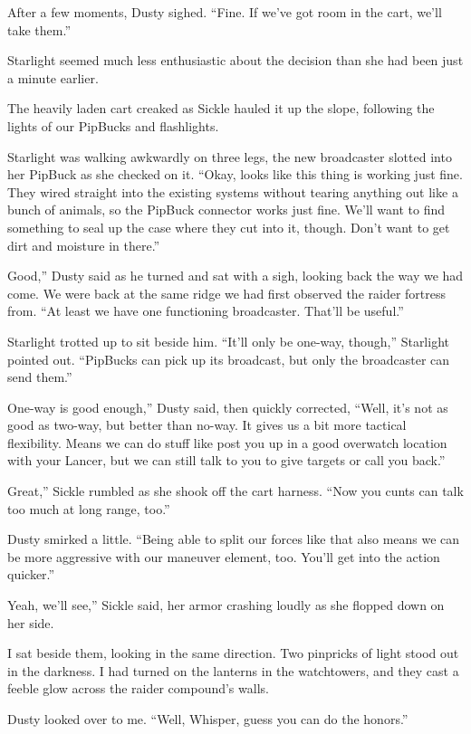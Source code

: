 After a few moments, Dusty sighed. “Fine. If we’ve got room in the cart, we’ll take them.”

Starlight seemed much less enthusiastic about the decision than she had been just a minute earlier.

{\br}%
The heavily laden cart creaked as Sickle hauled it up the slope, following the lights of our PipBucks and flashlights.

Starlight was walking awkwardly on three legs, the new broadcaster slotted into her PipBuck as she checked on it. “Okay, looks like this thing is working just fine. They wired straight into the existing systems without tearing anything out like a bunch of animals, so the PipBuck connector works just fine. We’ll want to find something to seal up the case where they cut into it, though. Don’t want to get dirt and moisture in there.”

\leavevmode{}Good,” Dusty said as he turned and sat with a sigh, looking back the way we had come. We were back at the same ridge we had first observed the raider fortress from. “At least we have one functioning broadcaster. That’ll be useful.”

Starlight trotted up to sit beside him. “It’ll only be one-way, though,” Starlight pointed out. “PipBucks can pick up its broadcast, but only the broadcaster can send them.”

\leavevmode{}One-way is good enough,” Dusty said, then quickly corrected, “Well, it’s not as good as two-way, but better than no-way. It gives us a bit more tactical flexibility. Means we can do stuff like post you up in a good overwatch location with your Lancer, but we can still talk to you to give targets or call you back.”

\leavevmode{}Great,” Sickle rumbled as she shook off the cart harness. “Now you cunts can talk too much at long range, too.”

Dusty smirked a little. “Being able to split our forces like that also means we can be more aggressive with our maneuver element, too. You’ll get into the action quicker.”

\leavevmode{}Yeah, we’ll see,” Sickle said, her armor crashing loudly as she flopped down on her side.

I sat beside them, looking in the same direction. Two pinpricks of light stood out in the darkness. I had turned on the lanterns in the watchtowers, and they cast a feeble glow across the raider compound’s walls.

Dusty looked over to me. “Well, Whisper, guess you can do the honors.”

